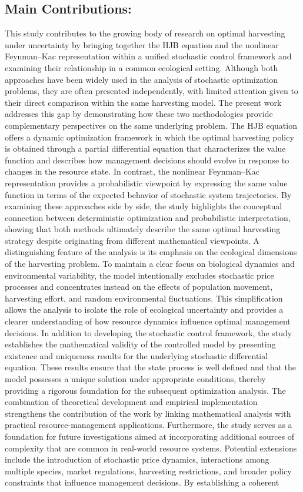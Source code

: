 \documentclass[11pt]{article}
\begin{document}
	\subsection{Main Contributions:}
	This study contributes to the growing body of research on optimal harvesting under uncertainty by bringing together the HJB equation and the nonlinear Feynman--Kac representation within a unified stochastic control framework and examining their relationship in a common ecological setting. Although both approaches have been widely used in the analysis of stochastic optimization problems, they are often presented independently, with limited attention given to their direct comparison within the same harvesting model. The present work addresses this gap by demonstrating how these two methodologies provide complementary perspectives on the same underlying problem. The HJB equation offers a dynamic optimization framework in which the optimal harvesting policy is obtained through a partial differential equation that characterizes the value function and describes how management decisions should evolve in response to changes in the resource state. In contrast, the nonlinear Feynman--Kac representation provides a probabilistic viewpoint by expressing the same value function in terms of the expected behavior of stochastic system trajectories. By examining these approaches side by side, the study highlights the conceptual connection between deterministic optimization and probabilistic interpretation, showing that both methods ultimately describe the same optimal harvesting strategy despite originating from different mathematical viewpoints. A distinguishing feature of the analysis is its emphasis on the ecological dimensions of the harvesting problem. To maintain a clear focus on biological dynamics and environmental variability, the model intentionally excludes stochastic price processes and concentrates instead on the effects of population movement, harvesting effort, and random environmental fluctuations. This simplification allows the analysis to isolate the role of ecological uncertainty and provides a clearer understanding of how resource dynamics influence optimal management decisions. In addition to developing the stochastic control framework, the study establishes the mathematical validity of the controlled model by presenting existence and uniqueness results for the underlying stochastic differential equation. These results ensure that the state process is well defined and that the model possesses a unique solution under appropriate conditions, thereby providing a rigorous foundation for the subsequent optimization analysis. The combination of theoretical development and empirical implementation strengthens the contribution of the work by linking mathematical analysis with practical resource-management applications. Furthermore, the study serves as a foundation for future investigations aimed at incorporating additional sources of complexity that are common in real-world resource systems. Potential extensions include the introduction of stochastic price dynamics, interactions among multiple species, market regulations, harvesting restrictions, and broader policy constraints that influence management decisions. By establishing a coherent 
\end{document}
